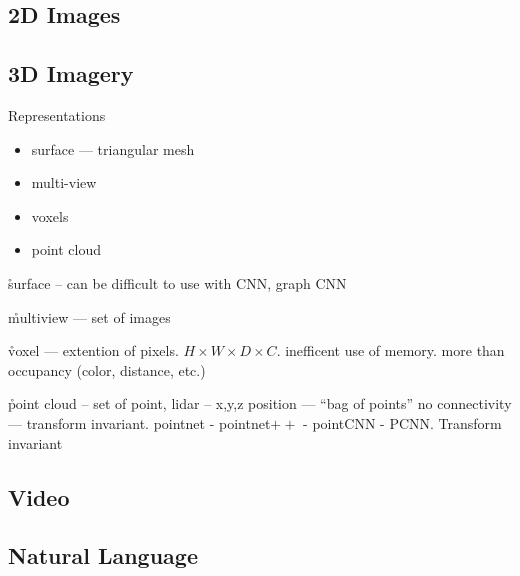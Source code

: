 

\subsection{2D Images}


\subsection{3D Imagery}

Representations
\begin{itemize}[noitemsep,topsep=0pt]
	\item surface --- triangular mesh
	\item multi-view
	\item voxels
	\item point cloud
\end{itemize}

\r{surface -- can be difficult to use with CNN, graph CNN}

\r{multiview --- set of images}


\r{voxel --- extention of pixels. $H \times W \times D \times C$. inefficent use of memory. more than occupancy (color, distance, etc.)}

\r{point cloud -- set of point, lidar -- x,y,z position --- ``bag of points'' no connectivity --- transform invariant. pointnet - pointnet$++$ - pointCNN - PCNN. Transform invariant}

\subsection{Video}




\subsection{Natural Language}

